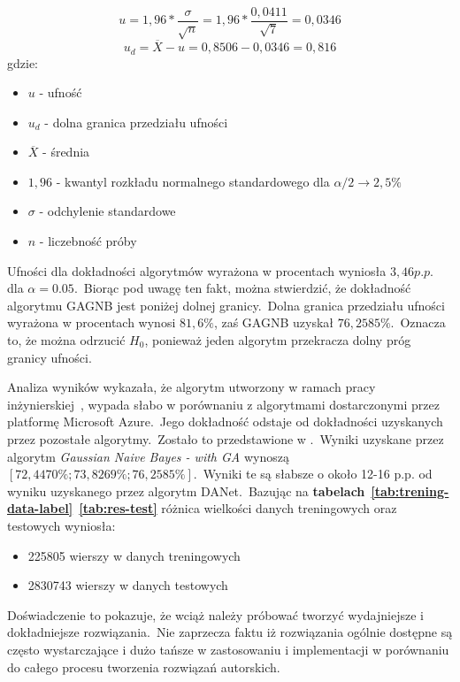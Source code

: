 \begin{itemize}
    \begin{equation}
        \label{eq:uf}
        u = 1,96 * \frac{\sigma}{\sqrt{n}} = 1,96*\frac{0,0411}{\sqrt{7}} = 0,0346
    \end{equation}
    \begin{equation}
        \label{eq:uf-d}
        u_d = \overline{X} - u = 0,8506 - 0,0346 = 0,816
    \end{equation}
    gdzie:
    \begin{itemize}
        \item $u$ - ufność
        \item $u_d$ - dolna granica przedziału ufności
        \item $\overline{X}$ - średnia
        \item $1,96$ - kwantyl rozkładu normalnego standardowego dla $\alpha/2 \rightarrow 2,5\%$
        \item $\sigma$ - odchylenie standardowe
        \item $n$ - liczebność próby
    \end{itemize}

    Ufności dla dokładności algorytmów wyrażona w procentach wyniosła $3,46 p.p.$ dla $\alpha = 0.05$.\ Biorąc pod uwagę ten fakt, można stwierdzić, że dokładność algorytmu GAGNB jest poniżej dolnej granicy.\ Dolna granica przedziału ufności wyrażona w procentach wynosi $81,6\%$, zaś GAGNB uzyskał $76,2585\%$.\ Oznacza to, że można odrzucić $H_0$, ponieważ jeden algorytm przekracza dolny próg granicy ufności. \\
\end{itemize}

Analiza wyników wykazała, że algorytm utworzony w ramach pracy inżynierskiej~\cite{Blyszcz2022}, wypada słabo w porównaniu z algorytmami dostarczonymi przez platformę Microsoft Azure.\ Jego dokładność odstaje od dokładności uzyskanych przez pozostałe algorytmy.\ Zostało to przedstawione w .\ Wyniki uzyskane przez algorytm \textit{Gaussian Naive Bayes - with GA} wynoszą $[72,4470\%; 73,8269\%; 76,2585\%]$.\ Wyniki te są słabsze o około 12-16 p.p. od wyniku uzyskanego przez algorytm DANet.\ Bazując na \textbf{tabelach}~\textbf{\ref{tab:trening-data-label}}~\textbf{\ref{tab:res-test}} różnica wielkości danych treningowych oraz testowych wyniosła:
\begin{itemize}
    \item 225805 wierszy w danych treningowych
    \item 2830743 wierszy w danych testowych
\end{itemize}

Doświadczenie to pokazuje, że wciąż należy próbować tworzyć wydajniejsze i dokładniejsze rozwiązania.\ Nie zaprzecza faktu iż rozwiązania ogólnie dostępne są często wystarczające i dużo tańsze w zastosowaniu i implementacji w porównaniu do całego procesu tworzenia rozwiązań autorskich.